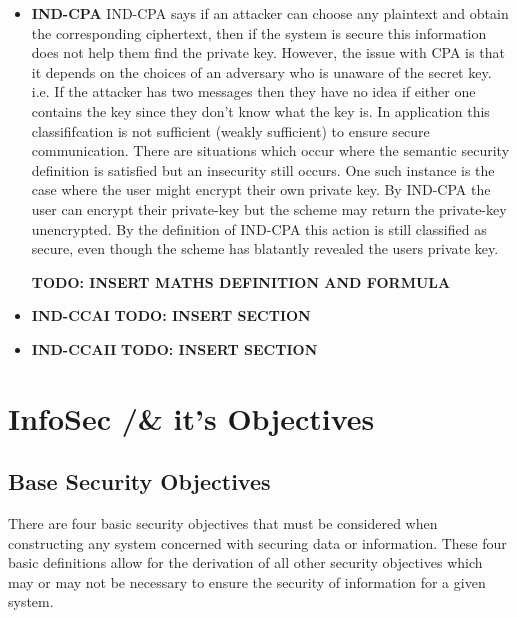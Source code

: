 \begin{itemize}
\item \textbf{IND-CPA} IND-CPA says if an attacker can choose any plaintext and obtain the corresponding ciphertext, then if the system is secure this information does not help them find the private key. However, the issue with CPA is that it depends on the choices of an adversary who is unaware of the secret key. i.e. If the
attacker has two messages then they have no idea if either one contains the key since they don't know what the key is. 
\newline 
In application this classififcation is not sufficient (weakly sufficient) to ensure secure communication. There are situations which occur where the semantic security definition is satisfied but an insecurity still occurs. One
such instance is the case where the user might encrypt their own private key. 
\newline 
By IND-CPA the user can encrypt their private-key but the scheme may return the private-key unencrypted. 
\newline 
By the definition of IND-CPA this action is still classified as secure, even though the scheme has blatantly revealed the users private key. 
\newline

\textbf{TODO: INSERT MATHS DEFINITION AND FORMULA}

\item \textbf{IND-CCAI} 
\textbf{TODO: INSERT SECTION}
\item \textbf{IND-CCAII}
\textbf{TODO: INSERT SECTION}
\end{itemize}

\section{InfoSec /& it's Objectives} 

\subsection{Base Security Objectives}

There are four basic security objectives that must be considered when constructing any system concerned with securing data or information. These four basic definitions allow for the derivation of all other security objectives which may or may not be necessary to ensure the security of information for a given system.

